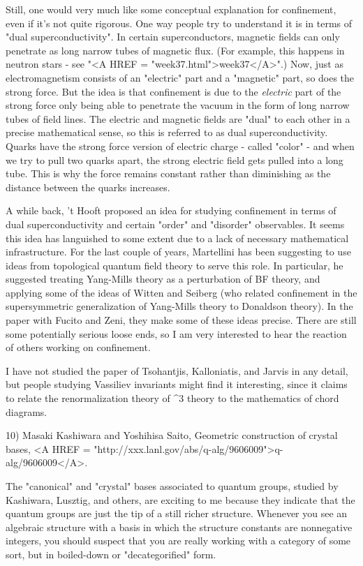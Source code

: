 Still, one would very much like some conceptual explanation for
confinement, even if it's not quite rigorous.  One way people try to
understand it is in terms of "dual superconductivity".  In certain
superconductors, magnetic fields can only penetrate as long narrow tubes
of magnetic flux.  (For example, this happens in neutron stars - see
"<A HREF = "week37.html">week37</A>".)  Now, just as electromagnetism consists of an "electric"
part and a "magnetic" part, so does the strong force.  But the idea is
that confinement is due to the \emph{electric} part of the strong force only
being able to penetrate the vacuum in the form of long narrow tubes of
field lines.  The electric and magnetic fields are "dual" to each other
in a precise mathematical sense, so this is referred to as dual
superconductivity.  Quarks have the strong force version of electric
charge - called "color" - and when we try to pull two quarks apart,
the strong electric field gets pulled into a long tube.  This is why the
force remains constant rather than diminishing as the distance between
the quarks increases.  

A while back, 't Hooft proposed an idea for studying confinement in
terms of dual superconductivity and certain "order" and "disorder"
observables.  It seems this idea has languished to some extent due
to a lack of necessary mathematical infrastructure.  For the last couple
of years, Martellini has been suggesting to use ideas from topological
quantum field theory to serve this role.  In particular, he suggested
treating Yang-Mills theory as a perturbation of BF theory, and applying
some of the ideas of Witten and Seiberg (who related confinement in the
supersymmetric generalization of Yang-Mills theory to Donaldson
theory). In the paper with Fucito and Zeni, they make some of these
ideas precise.  There are still some potentially serious loose ends, so
I am very interested to hear the reaction of others working on
confinement.  

I have not studied the paper of Tsohantjis, Kalloniatis, and Jarvis in
any detail, but people studying Vassiliev invariants might find it interesting,
since it claims to relate the renormalization theory of \phi ^3 theory
to the mathematics of chord diagrams.  

10) Masaki Kashiwara and Yoshihisa Saito, Geometric construction of
crystal bases, <A HREF = "http://xxx.lanl.gov/abs/q-alg/9606009">q-alg/9606009</A>.

The "canonical" and "crystal" bases associated to quantum groups,
studied by Kashiwara, Lusztig, and others, are exciting to me because
they indicate that the quantum groups are just the tip of a still richer
structure.  Whenever you see an algebraic structure with a basis in
which the structure constants are nonnegative integers, you should
suspect that you are really working with a category of some sort, but in
boiled-down or "decategorified" form.  

